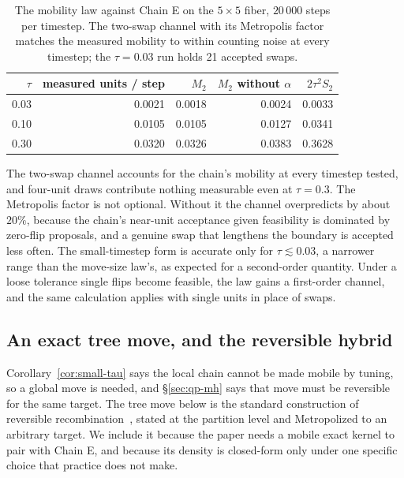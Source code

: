 \documentclass[11pt]{article}
\begin{document}
\begin{table}[htbp]
\centering
\small
\begin{tabular}{rrrrr}
\toprule
$\tau$ & measured units / step & $M_2$ & $M_2$ without $\alpha$ & $2\tau^2 S_2$ \\
\midrule
0.03 & 0.0021 & 0.0018 & 0.0024 & 0.0033 \\
0.10 & 0.0105 & 0.0105 & 0.0127 & 0.0341 \\
0.30 & 0.0320 & 0.0326 & 0.0383 & 0.3628 \\
\bottomrule
\end{tabular}
\caption{The mobility law against Chain E on the $5 \times 5$ fiber,
  $20\,000$ steps per timestep. The two-swap channel with its
  Metropolis factor matches the measured mobility to within counting
  noise at every timestep; the $\tau = 0.03$ run holds 21 accepted
  swaps.}\label{tab:mobility-law}
\end{table}

The two-swap channel accounts for the chain's mobility at every
timestep tested, and four-unit draws contribute nothing measurable
even at $\tau = 0.3$. The Metropolis factor is not optional. Without
it the channel overpredicts by about $20\%$, because the chain's
near-unit acceptance given feasibility is dominated by zero-flip
proposals, and a genuine swap that lengthens the boundary is accepted
less often. The small-timestep form is accurate only for
$\tau \lesssim 0.03$, a narrower range than the move-size law's, as
expected for a second-order quantity. Under a loose tolerance single
flips become feasible, the law gains a first-order channel, and the
same calculation applies with single units in place of swaps.

\subsection{An exact tree move, and the reversible hybrid}\label{sec:hybrid}

Corollary~\ref{cor:small-tau} says the local chain cannot be made
mobile by tuning, so a global move is needed, and \S\ref{sec:qp-mh}
says that move must be reversible for the same target. The tree move
below is the standard construction of reversible
recombination~\cite{cannon2022spanning,autry2023metropolized}, stated
at the partition level and Metropolized to an arbitrary target. We
include it because the paper needs a mobile exact kernel to pair with
Chain E, and because its density is closed-form only under one
specific choice that practice does not make.
\end{document}
